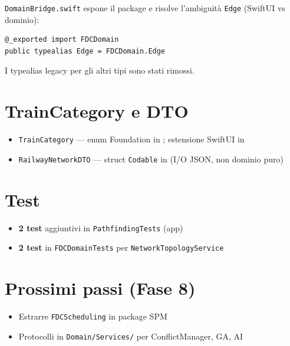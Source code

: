 \texttt{DomainBridge.swift} espone il package e risolve l'ambiguità
\texttt{Edge} (SwiftUI vs dominio):

\begin{verbatim}
@_exported import FDCDomain
public typealias Edge = FDCDomain.Edge
\end{verbatim}

I typealias legacy per gli altri tipi sono stati rimossi.

\section{TrainCategory e DTO}

\begin{itemize}
  \item \texttt{TrainCategory} --- enum Foundation in ;
        estensione SwiftUI in 
  \item \texttt{RailwayNetworkDTO} --- struct \texttt{Codable} in
         (I/O JSON, non dominio puro)
\end{itemize}

\section{Test}

\begin{itemize}
  \item \textbf{2 test} aggiuntivi in \texttt{PathfindingTests} (app)
  \item \textbf{2 test} in \texttt{FDCDomainTests} per \texttt{NetworkTopologyService}
\end{itemize}

\section{Prossimi passi (Fase 8)}

\begin{itemize}
  \item Estrarre \texttt{FDCScheduling} in package SPM
  \item Protocolli in \texttt{Domain/Services/} per ConflictManager, GA, AI
\end{itemize}
